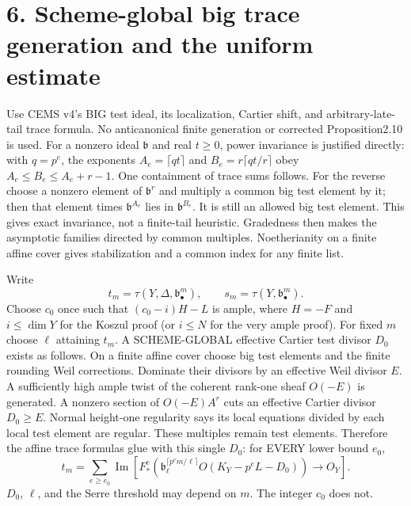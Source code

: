 \documentclass[11pt]{article}
\begin{document}
\section{6. Scheme-global big trace generation and the uniform estimate}

Use CEMS v4's BIG test ideal, its localization, Cartier shift, and arbitrary-late-tail trace formula. No anticanonical finite generation or corrected Proposition2.10 is used. For a nonzero ideal \(\mathfrak b\) and real \(t\ge0\), power invariance is justified directly: with \(q=p^e\), the exponents \(A_e=\lceil qt\rceil\) and \(B_e=r\lceil qt/r\rceil\) obey \(A_e\le B_e\le A_e+r-1\). One containment of trace sums follows. For the reverse choose a nonzero element of \(\mathfrak b^r\) and multiply a common big test element by it; then that element times \(\mathfrak b^{A_e}\) lies in \(\mathfrak b^{B_e}\). It is still an allowed big test element. This gives exact invariance, not a finite-tail heuristic. Gradedness then makes the asymptotic families directed by common multiples. Noetherianity on a finite affine cover gives stabilization and a common index for any finite list.

Write
\[
t_m=\tau(Y,\Delta,\mathfrak b_\bullet^m),\qquad
s_m=\tau(Y,\mathfrak b_\bullet^m).
\]
Choose \(c_0\) once such that \((c_0-i)H-L\) is ample, where \(H=-F\) and \(i\le\dim Y\) for the Koszul proof (or \(i\le N\) for the very ample proof). For fixed \(m\) choose \(\ell\) attaining \(t_m\). A SCHEME-GLOBAL effective Cartier test divisor \(D_0\) exists as follows. On a finite affine cover choose big test elements and the finite rounding Weil corrections. Dominate their divisors by an effective Weil divisor \(E\). A sufficiently high ample twist of the coherent rank-one sheaf \(O(-E)\) is generated. A nonzero section of \(O(-E)A^r\) cuts an effective Cartier divisor \(D_0\ge E\). Normal height-one regularity says its local equations divided by each local test element are regular. These multiples remain test elements. Therefore the affine trace formulas glue with this single \(D_0\): for EVERY lower bound \(e_0\),
\[
t_m=\sum_{e\ge e_0}\operatorname{Im}\left[
 F_*^e(\mathfrak b_\ell^{\lceil p^e m/\ell\rceil}
 O(K_Y-p^eL-D_0))\longrightarrow O_Y\right].
\]
\(D_0\), \(\ell\), and the Serre threshold may depend on \(m\). The integer \(c_0\) does not.
\end{document}

